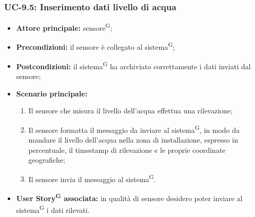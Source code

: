 \documentclass[8pt]{article}
\newcommand{\glossterm}[1]{#1\textsuperscript{G}} %
\begin{document}
\subsubsection*{UC-9.5: Inserimento dati livello di acqua}
\begin{itemize}
    \item \textbf{Attore principale:} \glossterm{sensore};
    \item \textbf{Precondizioni:} il sensore è collegato al \glossterm{sistema};
    \item \textbf{Postcondizioni:} il \glossterm{sistema} ha archiviato correttamente i dati inviati dal sensore;
    \item \textbf{Scenario principale:}
        \begin{enumerate}
        \item Il sensore che misura il livello dell'acqua effettua una rilevazione;
        \item Il sensore formatta il messaggio da inviare al \glossterm{sistema}, in modo da mandare il livello dell'acqua nella zona di installazione, espresso in percentuale, il timestamp di rilevazione e le proprie coordinate geografiche;
        \item Il sensore invia il messaggio al \glossterm{sistema}.
        \end{enumerate}
    \item \textbf{\glossterm{User Story} associata:} in qualità di sensore desidero poter inviare al \glossterm{sistema} i dati rilevati.
\end{itemize}
\end{document}
